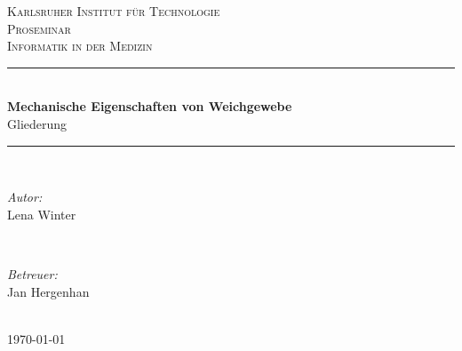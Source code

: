\documentclass[11pt]{article}
\begin{document}
\begin{titlepage}
\newcommand{\HRule}{\rule{\linewidth}{0.5mm}} %

\center 

\textsc{\LARGE Karlsruher Institut für Technologie}\\[1.5cm] %
\textsc{\Large Proseminar}\\[0.5cm] %
\textsc{\large Informatik in der Medizin}\\[0.5cm] %

\HRule \\[0.4cm]
{ \huge \bfseries Mechanische Eigenschaften von Weichgewebe}\\[0.4cm] %
{ \LARGE Gliederung}\\[0.4cm]
\HRule \\[1.5cm]
 

\begin{minipage}{0.4\textwidth}
\begin{flushleft} \large
\emph{Autor:}\\
 Lena Winter 
\end{flushleft}
\end{minipage}
~
\begin{minipage}{0.4\textwidth}
\begin{flushright} \large
\emph{Betreuer:} \\
Jan Hergenhan
\end{flushright}
\end{minipage}\\[4cm]



{\large \today}\\[3cm] %


 

\vfill %

\end{titlepage}
\end{document}
